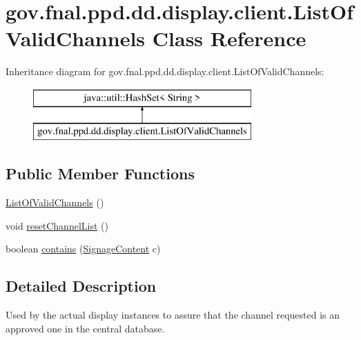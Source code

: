 \hypertarget{classgov_1_1fnal_1_1ppd_1_1dd_1_1display_1_1client_1_1ListOfValidChannels}{\section{gov.\-fnal.\-ppd.\-dd.\-display.\-client.\-List\-Of\-Valid\-Channels Class Reference}
\label{classgov_1_1fnal_1_1ppd_1_1dd_1_1display_1_1client_1_1ListOfValidChannels}
}
Inheritance diagram for gov.\-fnal.\-ppd.\-dd.\-display.\-client.\-List\-Of\-Valid\-Channels\-:\begin{figure}[H]
\begin{center}
\leavevmode
\includegraphics[height=2.000000cm]{classgov_1_1fnal_1_1ppd_1_1dd_1_1display_1_1client_1_1ListOfValidChannels}
\end{center}
\end{figure}
\subsection*{Public Member Functions}
\begin{DoxyCompactItemize}
\item 
\hyperlink{classgov_1_1fnal_1_1ppd_1_1dd_1_1display_1_1client_1_1ListOfValidChannels_a32b06c35045255ed512433f0a9c3d115}{List\-Of\-Valid\-Channels} ()
\item 
void \hyperlink{classgov_1_1fnal_1_1ppd_1_1dd_1_1display_1_1client_1_1ListOfValidChannels_ac7e8b27fed18f295c739273b25cc16f3}{reset\-Channel\-List} ()
\item 
boolean \hyperlink{classgov_1_1fnal_1_1ppd_1_1dd_1_1display_1_1client_1_1ListOfValidChannels_a46ab473927c0c932b8465dd400e5058b}{contains} (\hyperlink{interfacegov_1_1fnal_1_1ppd_1_1dd_1_1signage_1_1SignageContent}{Signage\-Content} c)
\end{DoxyCompactItemize}


\subsection{Detailed Description}
Used by the actual display instances to assure that the channel requested is an approved one in the central database.

